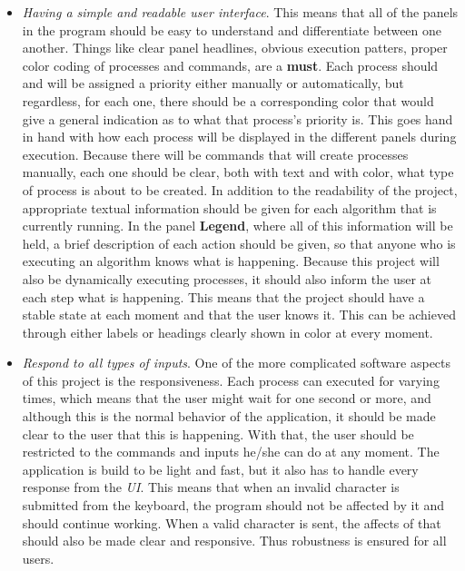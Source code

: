 \documentclass{article}
\begin{document}
\begin{itemize}
\item \textit{Having a simple and readable user interface}. This means that all of the panels in the program should be easy to understand and differentiate between one another. Things like clear panel headlines, obvious execution patters, proper color coding of processes and commands, are a \textbf{must}. Each process should and will be assigned a priority either manually or automatically, but regardless, for each one, there should be a corresponding color that would give a general indication as to what that process's priority is. This goes hand in hand with how each process will be displayed in the different panels during execution. Because there will be commands that will create processes manually, each one should be clear, both with text and with color, what type of process is about to be created. In addition to the readability of the project, appropriate textual information should be given for each algorithm that is currently running. In the panel \textbf{Legend}, where all of this information will be held, a brief description of each action should be given, so that anyone who is executing an algorithm knows what is happening. Because this project will also be dynamically executing processes, it should also inform the user at each step what is happening. This means that the project should have a stable state at each moment and that the user knows it. This can be achieved through either labels or headings clearly shown in color at every moment.

\item \textit{Respond to all types of inputs}. One of the more complicated software aspects of this project is the responsiveness. Each process can executed for varying times, which means that the user might wait for one second or more, and although this is the normal behavior of the application, it should be made clear to the user that this is happening. With that, the user should be restricted to the commands and inputs he/she can do at any moment. The application is build to be light and fast, but it also has to handle every response from the \textit{UI}. This means that when an invalid character is submitted from the keyboard, the program should not be affected by it and should continue working. When a valid character is sent, the affects of that should also be made clear and responsive. Thus robustness is ensured for all users.


\end{itemize}
\end{document}
